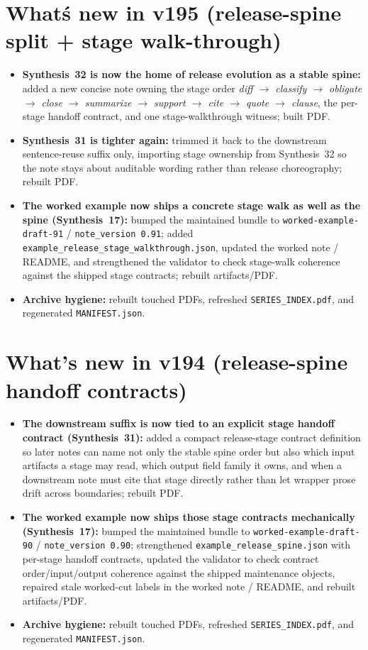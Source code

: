 \documentclass[11pt]{article}
\begin{document}
\section{What\'s new in v195 (release-spine split + stage walk-through)}
\begin{itemize}[leftmargin=*]
\item \textbf{Synthesis~32 is now the home of release evolution as a stable spine:} added a new concise note owning the stage order \emph{diff $\to$ classify $\to$ obligate $\to$ close $\to$ summarize $\to$ support $\to$ cite $\to$ quote $\to$ clause}, the per-stage handoff contract, and one stage-walkthrough witness; built PDF.
\item \textbf{Synthesis~31 is tighter again:} trimmed it back to the downstream sentence-reuse suffix only, importing stage ownership from Synthesis~32 so the note stays about auditable wording rather than release choreography; rebuilt PDF.
\item \textbf{The worked example now ships a concrete stage walk as well as the spine (Synthesis~17):} bumped the maintained bundle to \texttt{worked-example-draft-91} / \texttt{note\_version 0.91}; added \texttt{example\_release\_stage\_walkthrough.json}, updated the worked note / README, and strengthened the validator to check stage-walk coherence against the shipped stage contracts; rebuilt artifacts/PDF.
\item \textbf{Archive hygiene:} rebuilt touched PDFs, refreshed \texttt{SERIES\_INDEX.pdf}, and regenerated \texttt{MANIFEST.json}.
\end{itemize}

\section{What's new in v194 (release-spine handoff contracts)}
\begin{itemize}[leftmargin=*]
\item \textbf{The downstream suffix is now tied to an explicit stage handoff contract (Synthesis~31):} added a compact release-stage contract definition so later notes can name not only the stable spine order but also which input artifacts a stage may read, which output field family it owns, and when a downstream note must cite that stage directly rather than let wrapper prose drift across boundaries; rebuilt PDF.
\item \textbf{The worked example now ships those stage contracts mechanically (Synthesis~17):} bumped the maintained bundle to \texttt{worked-example-draft-90} / \texttt{note\_version 0.90}; strengthened \texttt{example\_release\_spine.json} with per-stage handoff contracts, updated the validator to check contract order/input/output coherence against the shipped maintenance objects, repaired stale worked-cut labels in the worked note / README, and rebuilt artifacts/PDF.
\item \textbf{Archive hygiene:} rebuilt touched PDFs, refreshed \texttt{SERIES\_INDEX.pdf}, and regenerated \texttt{MANIFEST.json}.
\end{itemize}
\end{document}
